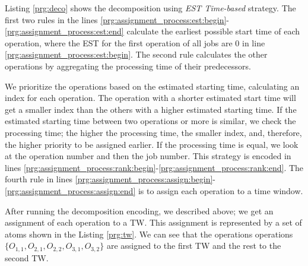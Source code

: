 \documentclass[runningheads]{llncs}
\begin{document}

Listing \ref{prg:deco} shows the decomposition using \emph{EST Time-based} strategy. The first two rules in the lines \ref{prg:assignment_process:est:begin}-\ref{prg:assignment_process:est:end} calculate the earliest possible start time of each operation, where the EST for the first operation of all jobs are $0$ in line \ref{prg:assignment_process:est:begin}. The second rule calculates the other operations by aggregating the processing time of their predecessors. 

We prioritize the operations based on the estimated starting time, calculating an index for each operation. The operation with a shorter estimated start time will get a smaller index than the others with a higher estimated starting time. If the estimated starting time between two operations or more is similar, we check the processing time; the higher the processing time, the smaller index, and, therefore, the higher priority to be assigned earlier. If the processing time is equal, we look at the operation number and then the job number. This strategy is encoded in lines \ref{prg:assignment_process:rank:begin}-\ref{prg:assignment_process:rank:end}. The fourth rule in lines \ref{prg:assignment_process:assign:begin}-\ref{prg:assignment_process:assign:end} is to assign each operation to a time window.



After running the decomposition encoding, we described above; we get an assignment of each operation to a TW. This assignment is represented by a set of atoms shown in the Listing \ref{prg:tw}. We can see that the operations operations $\{ O_{1,1}, O_{2,1}, O_{2,2}, O_{3,1}, O_{3,2} \}$ are assigned to the first TW and the rest to the second TW.


\end{document}
